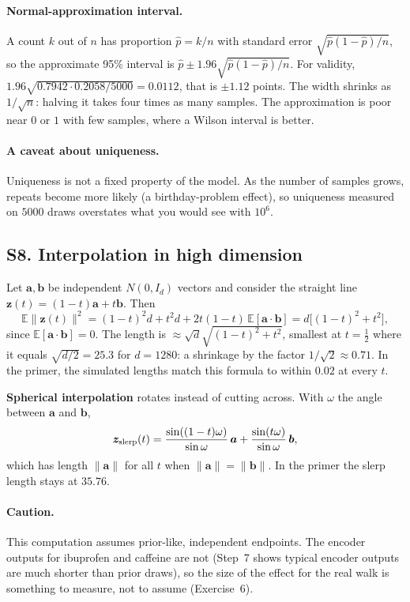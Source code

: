 \documentclass[11pt]{article}
\newcommand{\E}{\mathbb{E}}
\begin{document}
\paragraph{Normal-approximation interval.} A count $k$ out of $n$ has proportion $\hat p=k/n$ with standard error $\sqrt{\hat p(1-\hat p)/n}$, so the approximate 95\% interval is $\hat p\pm1.96\sqrt{\hat p(1-\hat p)/n}$. For validity, $1.96\sqrt{0.7942\cdot0.2058/5000}=0.0112$, that is $\pm1.12$ points. The width shrinks as $1/\sqrt n$: halving it takes four times as many samples. The approximation is poor near $0$ or $1$ with few samples, where a Wilson interval is better.

\paragraph{A caveat about uniqueness.} Uniqueness is not a fixed property of the model. As the number of samples grows, repeats become more likely (a birthday-problem effect), so uniqueness measured on $5000$ draws overstates what you would see with $10^6$.

\label{sec:S8}
\subsection*{S8. Interpolation in high dimension}
Let $\bm a,\bm b$ be independent $N(0,I_d)$ vectors and consider the straight line $\bm z(t)=(1-t)\bm a+t\bm b$. Then
\[
  \E\lVert\bm z(t)\rVert^2=(1-t)^2d+t^2d+2t(1-t)\,\E[\bm a\cdot\bm b]=d\big[(1-t)^2+t^2\big],
\]
since $\E[\bm a\cdot\bm b]=0$. The length is $\approx\sqrt d\sqrt{(1-t)^2+t^2}$, smallest at $t=\tfrac12$ where it equals $\sqrt{d/2}=25.3$ for $d=1280$: a shrinkage by the factor $1/\sqrt2\approx0.71$. In the primer, the simulated lengths match this formula to within $0.02$ at every $t$.

\textbf{Spherical interpolation} rotates instead of cutting across. With $\omega$ the angle between $\bm a$ and $\bm b$,
\[
  \bm z_{\rm slerp}(t)=\frac{\sin((1-t)\omega)}{\sin\omega}\,\bm a+\frac{\sin(t\omega)}{\sin\omega}\,\bm b,
\]
which has length $\lVert\bm a\rVert$ for all $t$ when $\lVert\bm a\rVert=\lVert\bm b\rVert$. In the primer the slerp length stays at $35.76$.

\paragraph{Caution.} This computation assumes prior-like, independent endpoints. The encoder outputs for ibuprofen and caffeine are not (Step~7 shows typical encoder outputs are much shorter than prior draws), so the size of the effect for the real walk is something to measure, not to assume (Exercise~6).
\end{document}
